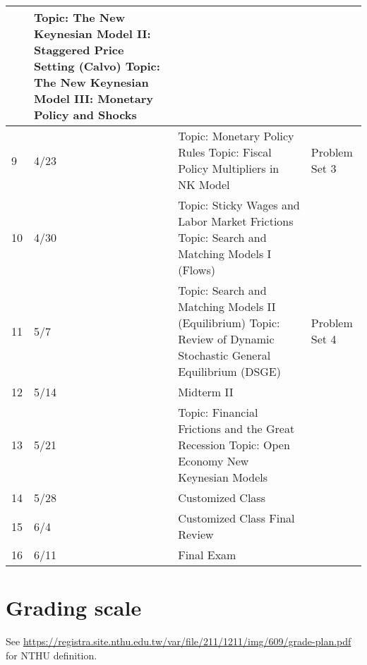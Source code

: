 \documentclass[12pt]{article}
\begin{document}
\begin{tabular}{|p{\bb}|p{\bb}|p{\pp}|p{\rr}|}
    &
        Topic: The New Keynesian Model II: Staggered Price Setting (Calvo)
        \newline
        Topic: The New Keynesian Model III: Monetary Policy and Shocks
        &
    \\
    \hline
        9
        &
        4/23
        &
        Topic: Monetary Policy Rules
    \newline
        Topic: Fiscal Policy Multipliers in NK Model
        &
        Problem Set 3
    \\
    \hline
        10
        &
        4/30
        &
        Topic: Sticky Wages and Labor Market Frictions
        \newline
         Topic: Search and Matching Models I (Flows)
        &
    \\
    \hline
        11
        &
        5/7
        &
        Topic: Search and Matching Models II (Equilibrium)
        \newline
        Topic: Review of Dynamic Stochastic General Equilibrium (DSGE)

&
        Problem Set 4
    \\
    \hline
        12
        &
        5/14
        &
        Midterm II
        &
    \\
    \hline
        13
        &
        5/21

       &
        Topic: Financial Frictions and the Great Recession
        \newline
        Topic: Open Economy New Keynesian Models
        &
    \\
    \hline
        14
        &
        5/28
        &
        Customized Class

    &
    \\
    \hline
        15
        &
        6/4
        &
        Customized Class
        \newline
        Final Review
        &
    \\
    \hline
        16

  &
        6/11
        &
        Final Exam
        &
    \\
    \hline
\end{tabular}

\section*{Grading scale}

See \url{https://registra.site.nthu.edu.tw/var/file/211/1211/img/609/grade-plan.pdf} for NTHU definition.
\end{document}
